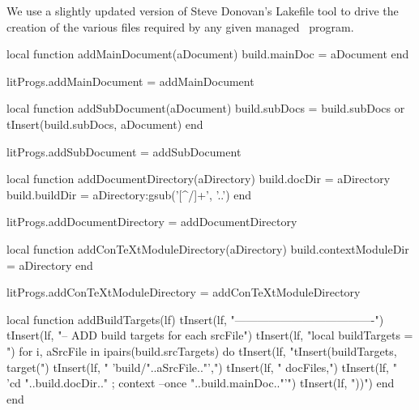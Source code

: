 
\startchapter[title=Lakefile]

We use a slightly updated version of Steve Donovan's Lakefile tool to 
drive the creation of the various files required by any given 
 managed \ConTeXt\ program. 

\startMkIVCode
\def\addMainDocument#1{
  \directlua{
    thirddata.literateProgs.addMainDocument('#1')
  }
}

\def\addSubDocument#1{
  \directlua{
    thirddata.literateProgs.addSubDocument('#1')
  }
}

\def\addDocumentDirectory#1{
  \directlua{
    thirddata.literateProgs.addDocumentDirectory('#1')
  }
}

\def\addConTeXtModuleDirectory#1{
  \directlua{
    thirddata.literateProgs.addConTeXtModuleDirectory('#1')
  }
}
\stopMkIVCode

\startLuaCode
local function addMainDocument(aDocument)
  build.mainDoc = aDocument
end

litProgs.addMainDocument = addMainDocument

local function addSubDocument(aDocument)
  build.subDocs = build.subDocs or { }
  tInsert(build.subDocs, aDocument)
end

litProgs.addSubDocument = addSubDocument

local function addDocumentDirectory(aDirectory)
  build.docDir   = aDirectory
  build.buildDir = aDirectory:gsub('[^/]+', '..')
end

litProgs.addDocumentDirectory = addDocumentDirectory

local function addConTeXtModuleDirectory(aDirectory)
  build.contextModuleDir = aDirectory
end

litProgs.addConTeXtModuleDirectory = addConTeXtModuleDirectory
\stopLuaCode

\startMkIVCode
\def\compileLakefile#1{
  \directlua{
    thirddata.literateProgs.compileLakefile('#1')
  }
}
\stopMkIVCode

\startLuaCode
local function addBuildTargets(lf)
  tInsert(lf, "-------------------------------------")
  tInsert(lf, "-- ADD build targets for each srcFile\n")
  tInsert(lf, "local buildTargets = {}\n")
  for i, aSrcFile in ipairs(build.srcTargets) do
    tInsert(lf, "tInsert(buildTargets, target(")
    tInsert(lf, "  'build/"..aSrcFile.."',")
    tInsert(lf, "  docFiles,")
    tInsert(lf, "  'cd "..build.docDir.." ; context --once "..build.mainDoc.."'")
    tInsert(lf, "))\n")
  end
end

